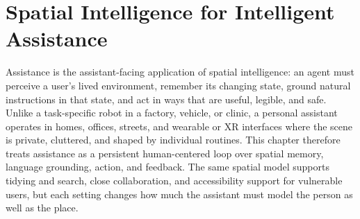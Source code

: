 \chapter{Spatial Intelligence for Intelligent Assistance}


 Assistance is the assistant-facing application of spatial intelligence: an agent must perceive a user's lived environment, remember its changing state, ground natural instructions in that state, and act in ways that are useful, legible, and safe.
Unlike a task-specific robot in a factory, vehicle, or clinic, a personal assistant operates in homes, offices, streets, and wearable or XR interfaces where the scene is private, cluttered, and shaped by individual routines.
This chapter therefore treats assistance as a persistent human-centered loop over spatial memory, language grounding, action, and feedback.
The same spatial model supports tidying and search, close collaboration, and accessibility support for vulnerable users, but each setting changes how much the assistant must model the person as well as the place.



